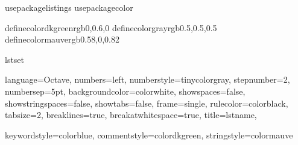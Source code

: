 usepackage{listings}
usepackage{color}

definecolor{dkgreen}{rgb}{0,0.6,0}
definecolor{gray}{rgb}{0.5,0.5,0.5}
definecolor{mauve}{rgb}{0.58,0,0.82}

lstset{ %
    language=Octave,                %
    numbers=left,                   %
    numberstyle=tinycolor{gray},    %
    stepnumber=2,                   %
    numbersep=5pt,                  
    backgroundcolor=color{white},   %
    showspaces=false,               
    showstringspaces=false,         
    showtabs=false,                
    frame=single,                   %
    rulecolor=color{black},        
    tabsize=2,                      %
    breaklines=true,                %
    breakatwhitespace=true,         %
    title=lstname,                  %
    
    keywordstyle=color{blue},       %
    commentstyle=color{dkgreen},    %
    stringstyle=color{mauve}        %
}
